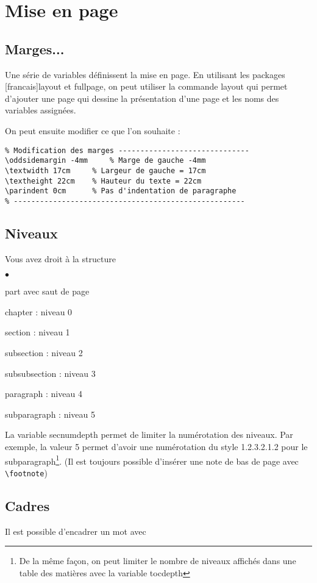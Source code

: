 \section{Mise en page}

\subsection{Marges...}

Une série de variables définissent la mise en page. En utilisant les packages [francais]{layout} et {fullpage}, on peut utiliser la commande layout qui permet d'ajouter une page qui dessine la présentation d'une page et les noms des variables assignées.

\layout

On peut ensuite modifier ce que l'on souhaite :
\begin{verbatim}
% Modification des marges ------------------------------
\oddsidemargin -4mm 	% Marge de gauche -4mm
\textwidth 17cm 	% Largeur de gauche = 17cm
\textheight 22cm 	% Hauteur du texte = 22cm
\parindent 0cm		% Pas d'indentation de paragraphe
% -----------------------------------------------------
\end{verbatim}

\subsection{Niveaux}

Vous avez droit à la structure

\begin{list}{$\bullet$}{}
\item part avec saut de page
\item chapter : niveau 0
\item section : niveau 1
\item subsection : niveau 2
\item subsubsection : niveau 3
\item paragraph : niveau 4
\item subparagraph : niveau 5
\end{list}

La variable secnumdepth permet de limiter la numérotation des niveaux. Par exemple, la valeur 5 permet d'avoir une numérotation du style 1.2.3.2.1.2 pour le subparagraph\footnote{De la même façon, on peut limiter le nombre de niveaux affichés dans une table des matières avec la variable tocdepth }. 
(Il est toujours possible d'insérer une note de bas de page avec \verb+\footnote+)

\subsection{Cadres}

Il est possible d'encadrer un mot avec 

